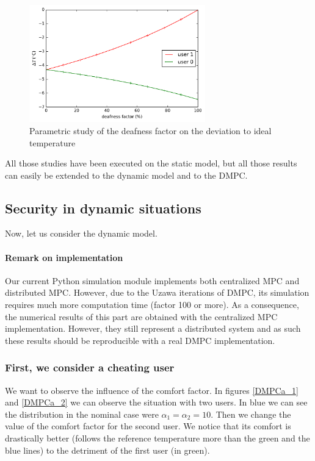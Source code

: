 \documentclass[conference]{IEEEtran}
\begin{document}
\begin{figure}[H]
\centering
\includegraphics[width=3in]{param_mult.pdf}
\caption{Parametric study of the deafness factor on the deviation to ideal temperature}
\label{SRecal_mult}
\end{figure}

All those studies have been executed on the static model, but all those results can easily be extended to the dynamic model and to the DMPC. 

\subsection{Security in dynamic situations}
Now, let us consider the dynamic model.

\paragraph*{Remark on implementation}
Our current Python simulation module implements both centralized MPC and distributed MPC. However, due to the Uzawa iterations of DMPC, its simulation requires much more computation time (factor 100 or more).
As a consequence, the numerical results of this part are obtained with
the centralized MPC implementation. However, they still represent a distributed system and as such these results should be reproducible with a real DMPC implementation.

\subsubsection{First, we consider a cheating user}
We want to observe the influence of the comfort factor. In figures \ref{DMPCa_1} and \ref{DMPCa_2} we can observe the situation with two users. In blue we can see the distribution in the nominal case were $\alpha_1=\alpha_2 = 10$. Then we change the value of the comfort factor for the second user. We notice that its comfort is drastically better (follows the reference temperature more than the green and the blue lines) to the detriment of the first user (in green).
\end{document}
